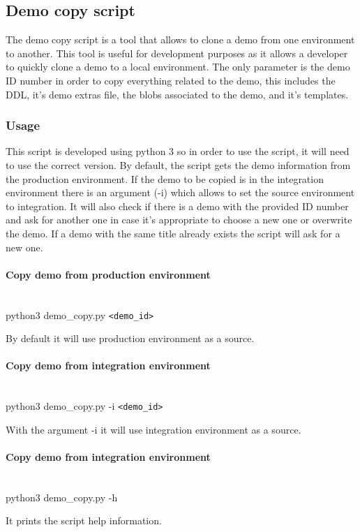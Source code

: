 \subsection{Demo copy script}

The demo copy script is a tool that allows to clone a demo from one environment to another. This tool is useful for development purposes
as it allows a developer to quickly clone a demo to a local environment. The only parameter is the demo ID number in order to copy
everything related to the demo, this includes the DDL, it's demo extras file, the blobs associated to the demo, and it's templates.

\subsubsection{Usage}
This script is developed using python 3 so in order to use the script, it will need to use the correct version. By default, the script gets
the demo information from the production environment. If the demo to be copied is in the integration environment there is an argument
(-i) which allows to set the source environment to integration.
It will also check if there is a demo with the provided ID number and ask for another one in case it's appropriate to choose
a new one or overwrite the demo. If a demo with the same title already exists the script will ask for a new one.

\paragraph{Copy demo from production environment} \hspace{0pt} \\
python3 demo\_copy.py {\tt <demo\_id>}

By default it will use production environment as a source.

\paragraph{Copy demo from integration environment} \hspace{0pt} \\
python3 demo\_copy.py -i {\tt <demo\_id>}

With the argument -i it will use integration environment as a source.

\paragraph{Copy demo from integration environment} \hspace{0pt} \\
python3 demo\_copy.py -h

It prints the script help information.

